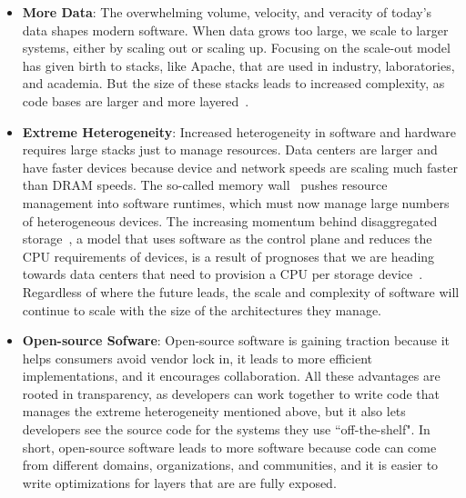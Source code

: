 \begin{itemize}
\item \textbf{More Data}: The overwhelming volume, velocity, and veracity of today's
data shapes modern software. When data grows too large, we scale to larger
systems, either by scaling out or scaling up. Focusing on the scale-out model
has given birth to stacks, like Apache, that are used in industry,
laboratories, and academia. But the size of these stacks leads to increased
complexity, as code bases are larger and more
layered~\cite{sevilla:eurosys17-malacology}.

\item \textbf{Extreme Heterogeneity}: Increased heterogeneity in software and
hardware requires large stacks just to manage resources.  Data centers are
larger and have faster devices because device and network speeds are scaling
much faster than DRAM speeds. The so-called memory
wall~\cite{wulf:sigarch1995-memory-wall} pushes resource management into
software runtimes, which must now manage large numbers of heterogeneous
devices. The increasing momentum behind disaggregated
storage~\cite{klimovic:asplos2017-reflex, klimovic:eurosys16-disagg}, a model
that uses software as the control plane and reduces the CPU requirements of
devices, is a result of prognoses that we are heading towards data centers that
need to provision a CPU per storage device~\cite{samuels:oss16}. Regardless of
where the future leads, the scale and complexity of software will continue to
scale with the size of the architectures they manage.

\item \textbf{Open-source Sofware}: Open-source software is gaining traction because
it helps consumers avoid vendor lock in, it leads to more efficient
implementations, and it encourages collaboration. All these advantages are
rooted in transparency, as developers can work together to write code that
manages the extreme heterogeneity mentioned above, but it also lets developers
see the source code for the systems they use ``off-the-shelf". In short,
open-source software leads to more software because code can come from
different domains, organizations, and communities, and it is easier to write
optimizations for layers that are are fully exposed.

\end{itemize}

